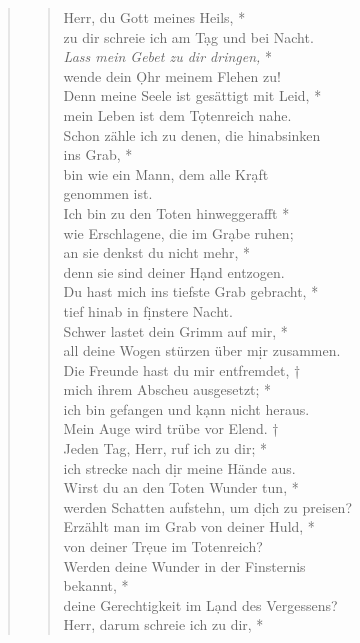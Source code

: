 \begin{quote}
\begin{verse}
 Herr, du Gott meines Heils, *\\
zu dir schreie ich am T\d ag und bei Nacht.\\ \vin  
\textit{Lass mein Gebet zu dir dringen,} *\\ \vin 
wende dein \d Ohr meinem Flehen zu!\\ 
Denn meine Seele ist gesättigt mit Leid, *\\
mein Leben ist dem T\d otenreich nahe.\\ \vin  
Schon zähle ich zu denen, die hinabsinken \\ \vin ins Grab, *\\ \vin 
bin wie ein Mann, dem alle Kr\d aft \\ \vin genommen ist.\\ 
Ich bin zu den Toten hinweggerafft *\\
wie Erschlagene, die im Gr\d abe ruhen;\\
\vin an sie denkst du nicht mehr, *\\ 
\vin denn sie sind deiner H\d and entzogen.\\  
Du hast mich ins tiefste Grab gebracht, *\\ 
tief hinab in f\d instere Nacht.\\
 \vin Schwer lastet dein Grimm auf mir, *\\
 \vin all deine Wogen stürzen über m\d ir zusammen.\\   
Die Freunde hast du mir entfremdet, †\\  
mich ihrem Abscheu ausgesetzt; *\\  ich bin gefangen und k\d ann nicht heraus.\\ 
\vin Mein Auge wird trübe vor Elend.  †\\
\vin Jeden Tag, Herr, ruf ich zu dir; *\\ \vin ich strecke nach d\d ir meine Hände aus.\\
 Wirst du an den Toten Wunder tun, *\\
 werden Schatten aufstehn, um d\d ich zu preisen? \\ 
\vin Erzählt man im Grab von deiner Huld, *\\
\vin von deiner Tr\d eue im Totenreich?\\
 Werden deine Wunder in der Finsternis \\  bekannt, *\\
 deine Gerechtigkeit im L\d and des Vergessens?\\
\vin Herr, darum schreie ich zu dir, *\\

\end{verse}
\end{quote}
